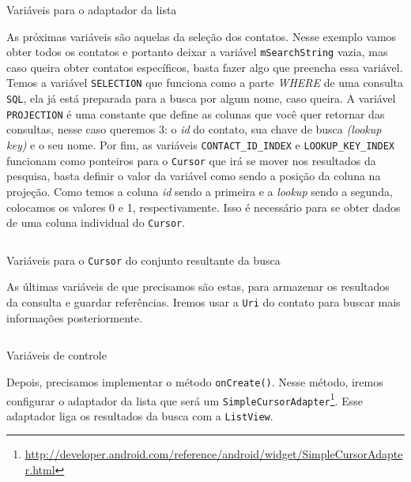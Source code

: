 \documentclass[a4paper,12pt,brazil,oneside]{book}
\begin{document}
		\begin{listing}[H]
		\inputminted[linenos=true,fontsize=\small,frame=lines, framesep=2mm, tabsize=2,numbersep=5pt]{java}{src/api/contacts/fromto.java}
		\caption{Variáveis para o adaptador da lista}
		\label{code:contactadaptervar}
		\end{listing} 	

	As próximas variáveis são aquelas da seleção dos contatos. Nesse exemplo vamos obter todos os contatos e portanto deixar a variável \texttt{mSearchString} vazia, mas caso queira obter contatos específicos, basta fazer algo que preencha essa variável. Temos a variável \texttt{SELECTION} que funciona como a parte \emph{WHERE} de uma consulta \texttt{SQL}, ela já está preparada para a busca por algum nome, caso queira. A variável \texttt{PROJECTION} é uma constante que define as colunas que você quer retornar das consultas, nesse caso queremos 3: o \emph{id} do contato, sua chave de busca \emph{(lookup key)} e o seu nome. Por fim, as variáveis \texttt{CONTACT\_ID\_INDEX} e \texttt{LOOKUP\_KEY\_INDEX} funcionam como ponteiros para o \texttt{Cursor} que irá se mover nos resultados da pesquisa, basta definir o valor da variável como sendo a posição da coluna na projeção. Como temos a coluna \emph{id} sendo a primeira e a \emph{lookup} sendo a segunda, colocamos os valores 0 e 1, respectivamente. Isso é necessário para se obter dados de uma coluna individual do \texttt{Cursor}.

		\begin{listing}[H]
		\inputminted[linenos=true,fontsize=\small,frame=lines, framesep=2mm, tabsize=2,numbersep=5pt]{java}{src/api/contacts/morevar.java}
		\caption{Variáveis para o \texttt{Cursor} do conjunto resultante da busca}
		\label{code:contactcursorvar}
		\end{listing} 	

	As últimas variáveis de que precisamos são estas, para armazenar os resultados da consulta e guardar referências. Iremos usar a \texttt{Uri} do contato para buscar mais informações posteriormente.

		\begin{listing}[H]
		\inputminted[linenos=true,fontsize=\small,frame=lines, framesep=2mm, tabsize=2,numbersep=5pt]{java}{src/api/contacts/lastvar.java}
		\caption{Variáveis de controle}
		\label{code:contactlastvar}
		\end{listing} 	

	Depois, precisamos implementar o método \texttt{onCreate()}. Nesse método, iremos configurar o adaptador da lista que será um \texttt{SimpleCursorAdapter}\footnote{\href{http://developer.android.com/reference/android/widget/SimpleCursorAdapter.html}{http://developer.android.com/reference/android/widget/SimpleCursorAdapter.html}}. Esse adaptador liga os resultados da busca com a \texttt{ListView}.
\end{document}
